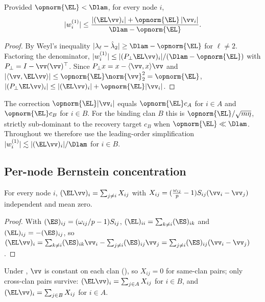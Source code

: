 \begin{lemma}\label{lem:C-first}
Provided $\opnorm{\EL}<\Dlam$, for every node $i$,
\begin{equation}
   |w^{(1)}_i|\le\frac{|(\EL\vv)_i|+\opnorm{\EL}\,|\vv_i|}{\Dlam-\opnorm{\EL}}.
\end{equation}
\end{lemma}
\begin{proof}
By Weyl's inequality $|\lambda_\ell-\hat\lambda_2|\ge\Dlam-\opnorm{\EL}$ for
$\ell\ne2$. Factoring the denominator,
$|w^{(1)}_i|\le|(P_\perp\EL\vv)_i|/(\Dlam-\opnorm{\EL})$ with
$P_\perp=I-\vv(\vv)^\top$. Since $P_\perp x=x-\langle\vv,x\rangle\vv$ and
$|\langle\vv,\EL\vv\rangle|\le\opnorm{\EL}\norm{\vv}_2^2=\opnorm{\EL}$,
$|(P_\perp\EL\vv)_i|\le|(\EL\vv)_i|+\opnorm{\EL}|\vv_i|$.
\end{proof}

\begin{remark}\label{rem:C-asym}
The correction $\opnorm{\EL}|\vv_i|$ equals $\opnorm{\EL}c_A$ for $i\in A$ and
$\opnorm{\EL}c_B$ for $i\in B$. For the binding clan $B$ this is
$\opnorm{\EL}/\sqrt{m\eta}$, strictly sub-dominant to the recovery target $c_B$
when $\opnorm{\EL}\ll\Dlam$. Throughout  we therefore use the
leading-order simplification $|w^{(1)}_i|\lesssim|(\EL\vv)_i|/\Dlam$ for $i\in B$.
\end{remark}

\subsection{Per-node Bernstein concentration}\label{app:comp3b}

\begin{lemma}\label{lem:C-inc}
For every node $i$, $(\EL\vv)_i=\sum_{j\ne i}X_{ij}$ with
$X_{ij}=(\tfrac{\omega_{ij}}{p}-1)S_{ij}(\vv_i-\vv_j)$ independent and mean zero.
\end{lemma}
\begin{proof}
With $(\ES)_{ij}=(\omega_{ij}/p-1)S_{ij}$, $(\EL)_{ii}=\sum_{k\ne i}(\ES)_{ik}$ and
$(\EL)_{ij}=-(\ES)_{ij}$, so
$(\EL\vv)_i=\sum_{k\ne i}(\ES)_{ik}\vv_i-\sum_{j\ne i}(\ES)_{ij}\vv_j
=\sum_{j\ne i}(\ES)_{ij}(\vv_i-\vv_j)$.
\end{proof}

\begin{proposition}\label{prop:C-within}
Under , $\vv$ is constant on each clan (), so
$X_{ij}=0$ for same-clan pairs; only cross-clan pairs survive:
$(\EL\vv)_i=\sum_{j\in A}X_{ij}$ for $i\in B$, and
$(\EL\vv)_i=\sum_{j\in B}X_{ij}$ for $i\in A$.
\end{proposition}

